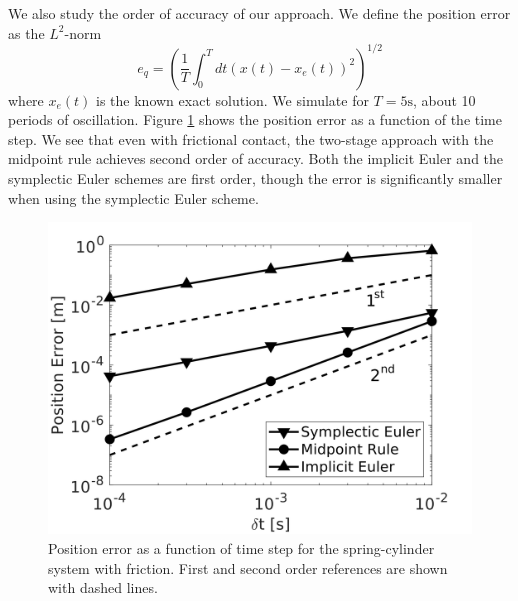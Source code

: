 We also study the order of accuracy of our approach. We define the position error as the $L^2$-norm
\begin{equation*}
    e_q = \left(\frac{1}{T}\int_0^T dt(x(t)-x_e(t))^2\right)^{1/2}
\end{equation*}
where $x_e(t)$ is the known exact solution. We simulate for $T=5\text{
s}$, about 10 periods of oscillation. Figure \ref{fig:spring_cylinder_position_error} shows the position error as
a function of the time step. We see that even with frictional contact, the two-stage approach
with the midpoint rule achieves second order of accuracy. Both the implicit Euler and the symplectic Euler schemes are first order,
though the error is significantly smaller when using the symplectic Euler
scheme.
\begin{figure}[!h]
	\centering
	\includegraphics[width=0.6\columnwidth]{figures/spring_cylinder/position_error.png}
	\caption{\label{fig:spring_cylinder_position_error} 
	Position error as a function of time step for the spring-cylinder system
	with friction. First and second order references are shown with dashed
	lines.}
\end{figure}